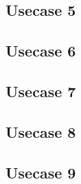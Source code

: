 \subsection{Usecase 5}


\subsection{Usecase 6}


\subsection{Usecase 7}



\subsection{Usecase 8}


\subsection{Usecase 9}

